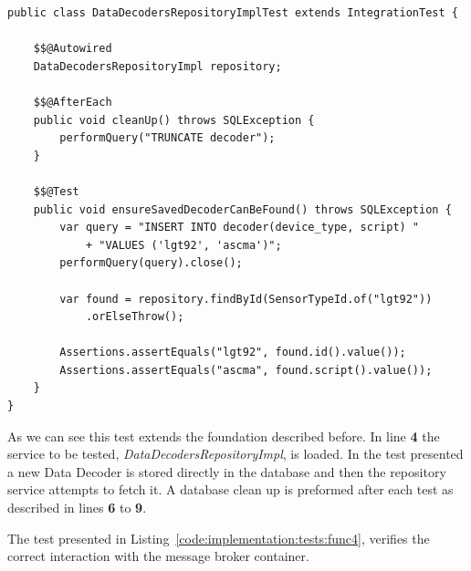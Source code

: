 \begin{lstlisting}[style=Java, caption=Functional Test - Database Interaction - \textbf{Data Decoder Master Backend}, label={code:implementation:tests:func3}]
public class DataDecodersRepositoryImplTest extends IntegrationTest {

    $$@Autowired
    DataDecodersRepositoryImpl repository;

    $$@AfterEach
    public void cleanUp() throws SQLException {
        performQuery("TRUNCATE decoder");
    }

    $$@Test
    public void ensureSavedDecoderCanBeFound() throws SQLException {
        var query = "INSERT INTO decoder(device_type, script) "
            + "VALUES ('lgt92', 'ascma')";
        performQuery(query).close();

        var found = repository.findById(SensorTypeId.of("lgt92"))
            .orElseThrow();

        Assertions.assertEquals("lgt92", found.id().value());
        Assertions.assertEquals("ascma", found.script().value());
    }
}
\end{lstlisting}

As we can see this test extends the foundation described before. In line \textbf{4} the service to be tested, \textit{DataDecodersRepositoryImpl}, is loaded. In the test presented a new Data Decoder is stored directly in the database and then the repository service attempts to fetch it. A database clean up is preformed after each test as described in lines \textbf{6} to \textbf{9}.

The test presented in Listing~\ref{code:implementation:tests:func4}, verifies the correct interaction with the message broker container.

